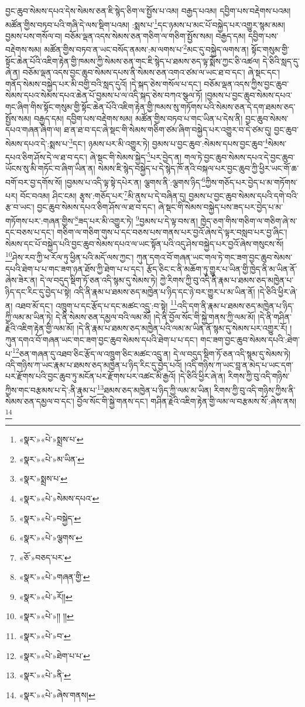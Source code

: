 བྱང་ཆུབ་སེམས་དཔའ་དེས་སེམས་ཅན་ཇི་སྙེད་ཅིག་ལ་སྤྱོས་པ་འམ། བརྒྱད་པའམ། དབྱིག་པས་བརྡེགས་པའམ། མཚོན་གྱིས་བཏབ་པའི་གཞི་དེ་ལས་སྡིག་པའམ། :སྨས་པ་\footnote{«སྣར་»«པེ་»སྨྲས་པ་}དང་ཉམས་པ་མང་པོ་བསྐྱེད་པར་འགྱུར་སྙམ་མམ། བྱམས་པས་གསོལ་བ། བཅོམ་ལྡན་འདས་སེམས་ཅན་གཅིག་ལ་གཅིག་སྤྱོས་སམ། བརྒྱད་དམ། དབྱིག་པས་བརྡེགས་སམ། མཚོན་གྱིས་བཏབ་ན་ཡང་བསོད་ནམས་:མ་ལགས་པ་\footnote{«སྣར་»«པེ་»མ་ཡིན་}མང་དུ་བསྐྱེད་ལགས་ན། སྟོང་གསུམ་གྱི་སྟོང་ཆེན་པོའི་འཇིག་རྟེན་གྱི་ཁམས་ཀྱི་སེམས་ཅན་གང་ཇི་སྙེད་པ་ཐམས་ཅད་ལྟ་སྨོས་ཀྱང་ཅི་འཚལ། དེ་ཅིའི་སླད་དུ་ཞེ་ན། བཅོམ་ལྡན་འདས་བྱང་ཆུབ་སེམས་དཔས་ནི་སེམས་ཅན་འགའ་ཙམ་ལ་ཡང་ཐ་བ་དང་། ཞེ་སྡང་དང་། གནོད་སེམས་བསྐྱེད་པར་མི་བགྱི་བའི་སླད་དུའོ། །དེ་སྐད་ཅེས་གསོལ་པ་དང་། བཅོམ་ལྡན་འདས་ཀྱིས་བྱང་ཆུབ་སེམས་དཔའ་སེམས་དཔའ་ཆེན་པོ་བྱམས་པ་ལ་འདི་སྐད་ཅེས་བཀའ་སྩལ་ཏོ། །བྱམས་པ་བྱང་ཆུབ་སེམས་དཔའ་གང་ཞིག་གིས་སྟོང་གསུམ་གྱི་སྟོང་ཆེན་པོའི་འཇིག་རྟེན་གྱི་ཁམས་སུ་གཏོགས་པའི་སེམས་ཅན་དེ་དག་ཐམས་ཅད་སྤྱོས་སམ། བརྒྱད་དམ། དབྱིག་པས་བརྡེགས་སམ། མཚོན་གྱིས་བཏབ་པ་གང་ཡིན་པ་དེས་ནི། བྱང་ཆུབ་སེམས་དཔའ་གཞན་ཞིག་ལ། ཐ་ན་ཐ་བ་དང་ཞེ་སྡང་གི་སེམས་གཅིག་ཙམ་ཞིག་བསྐྱེད་པར་འགྱུར་བ་དེ་ཙམ་དུ། བྱང་ཆུབ་སེམས་དཔའ་དེ་:སྨས་པ་\footnote{«སྣར་»སྨྲས་པ་}དང་། ཉམས་པར་མི་འགྱུར་ཏེ། བྱམས་པ་བྱང་ཆུབ་:སེམས་དཔས་བྱང་ཆུབ་\footnote{«སྣར་»«པེ་»སེམས་དཔའ་}སེམས་དཔའ་ཅིག་ཤོས་དེ་ལ་ཐ་བ་དང་། ཞེ་སྡང་གི་སེམས་སྐྱེད་\footnote{«སྣར་»«པེ་»བསྐྱེད་}པར་བྱེད་ན། གལ་ཏེ་བྱང་ཆུབ་སེམས་དཔའ་དེ་བྱང་ཆུབ་ཡོངས་སུ་མི་གཏོང་བ་ཞིག་ཡིན་ན། སེམས་ཇི་སྙེད་བསྐྱེད་པ་དེ་སྙེད་ཁོ་ནའི་བསྐལ་པར་བྱང་ཆུབ་ཀྱི་ཕྱིར་ཡང་གོ་ཆ་བགོ་བར་བྱ་དགོས་སོ། །བྱམས་པ་འདི་ལྟ་སྟེ་དཔེར་ན། ལྕགས་ནི་:ལྕགས་ཉིད་\footnote{«སྣར་»«པེ་»ལྕགས་}ཀྱིས་གཅོད་པར་བྱེད་པ་མ་གཏོགས་པར། བོང་བའམ། ཤིང་ངམ། རྩྭས་:གཅོད་པར་\footnote{«ཅོ་»བཅད་པར་}མི་ནུས་པ་དེ་བཞིན་དུ། བྱམས་པ་བྱང་ཆུབ་སེམས་དཔའི་དགེ་བའི་རྩ་བ་ཡང་། བྱང་ཆུབ་སེམས་དཔའ་ཅིག་ཤོས་ལ་ཐ་བ་དང་། ཞེ་སྡང་གི་སེམས་བསྐྱེད་པས་ཟད་པར་བྱེད་པ་མ་གཏོགས་པར་:གཞན་གྱིས་\footnote{«སྣར་»«པེ་»གཞན་གྱི་}ཟད་པར་མི་འགྱུར་ཏེ། \footnote{«སྣར་»«པེ་»རོ།། }བྱམས་པ་དེ་ལྟ་བས་ན། ཁྱེད་ཅག་གིས་གཅིག་ལ་གཅིག་ཞེ་ས་དང་བཅས་པ་དང་། གཅིག་ལ་གཅིག་གུས་པ་དང་བཅས་པས་གནས་པར་བྱའོ་ཞེས་དེ་ལྟར་བསླབ་པར་བྱ་ཞིང་། སེམས་དང་པོ་བསྐྱེད་པའི་བྱང་ཆུབ་སེམས་དཔའ་ལ་ཡང་སྟོན་པའི་འདུ་ཤེས་བསྐྱེད་པར་བྱའོ་ཞེས་གསུངས་སོ། \footnote{«སྣར་»«པེ་»།། །།}ཤེས་རབ་ཀྱི་ཕ་རོལ་ཏུ་ཕྱིན་པའི་མདོ་ལས་ཀྱང་། ཀུན་དགའ་བོ་གཞན་ཡང་གལ་ཏེ་གང་ཟག་བྱང་ཆུབ་སེམས་དཔའི་ཐེག་པ་པ་གང་ཟག་ཉན་ཐོས་ཀྱི་ཐེག་པ་པ་དང་། རྩོད་ཅིང་ང་ནི་མཆོག་ཏུ་གྱུར་པ་ཡིན་གྱི་ཁྱེད་ནི་མ་ཡིན་ནོ་ཞེས་ཟེར་ན། དེ་ལ་བདུད་སྡིག་ཏོ་ཅན་འདི་སྙམ་དུ་སེམས་ཏེ། ཀྱེ་རིགས་ཀྱི་བུ་འདི་ནི་རྣམ་པ་ཐམས་ཅད་མཁྱེན་པ་ཉིད་དང་རིང་དུ་བྱེད་པ་སྟེ། འདི་ནི་རྣམ་པ་ཐམས་ཅད་མཁྱེན་པ་ཉིད་དང་ཉེ་བར་གྱུར་པ་མ་ཡིན་ནོ། །དེ་ཅིའི་ཕྱིར་ཞེ་ན། འཐབ་མོ་དང་། འཁྲུག་པ་དང་རྩོད་པ་དང་མཚང་འདྲུ་:བ་སྟེ། \footnote{«སྣར་»«པེ་»བ་}འདི་དག་ནི་རྣམ་པ་ཐམས་ཅད་མཁྱེན་པ་ཉིད་ཀྱི་ལམ་མ་ཡིན་ཏེ། དེ་ནི་སེམས་ཅན་དམྱལ་བའི་ལམ་མོ། །དེ་ནི་བྱོལ་སོང་གི་སྐྱེ་གནས་ཀྱི་ལམ་མོ། །དེ་ནི་གཤིན་རྗེའི་འཇིག་རྟེན་གྱི་ལམ་མོ། །དེ་ནི་རྣམ་པ་ཐམས་ཅད་མཁྱེན་པའི་ལམ་མ་ཡིན་ནོ་སྙམ་དུ་སེམས་པར་འགྱུར་རོ། །ཀུན་དགའ་བོ་གཞན་ཡང་གང་ཟག་བྱང་ཆུབ་སེམས་དཔའི་ཐེག་པ་པ་དང་། གང་ཟག་བྱང་ཆུབ་སེམས་དཔའི་:ཐེག་པ་\footnote{«སྣར་»«པེ་»ཐེག་པ་པ་}ཅན་གཞན་དུ་འཐབ་ཅིང་རྩོད་ལ་འཁྲུག་ཅིང་མཚང་འདྲུ་ན། དེ་ལ་བདུད་སྡིག་ཏོ་ཅན་འདི་སྙམ་དུ་སེམས་ཏེ། འདི་གཉིས་ཀ་ཡང་རྣམ་པ་ཐམས་ཅད་མཁྱེན་པ་ཉིད་རིང་དུ་བྱེད་པའོ། །འདི་གཉིས་ཀ་ཡང་བླ་ན་མེད་པ་ཡང་དག་པར་རྫོགས་པའི་བྱང་ཆུབ་ཏུ་མངོན་པར་རྫོགས་པར་འཚང་མི་རྒྱའོ། །དེ་ཅིའི་ཕྱིར་ཞེ་ན། རིགས་ཀྱི་བུ་འདི་གཉིས་ཀྱིས་གང་བརྩམས་པ་དེ་:ནི་རྣམ་པ་\footnote{«སྣར་»«པེ་»ནི་}ཐམས་ཅད་མཁྱེན་པ་ཉིད་ཀྱི་ལམ་མ་ཡིན། རིགས་ཀྱི་བུ་འདི་གཉིས་ཀྱིས་ནི་སེམས་ཅན་དམྱལ་བ་དང་། བྱོལ་སོང་གི་སྐྱེ་གནས་དང་། གཤིན་རྗེའི་འཇིག་རྟེན་གྱི་ལམ་ལ་བརྩམས་སོ་:ཞེས་ནས།\footnote{«སྣར་»«པེ་»ཞེས་གནས།} 